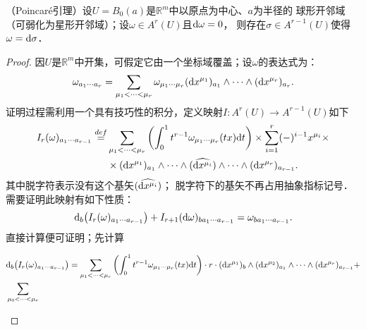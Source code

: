 \begin{theorem}\label{chdf:thm_poincare-lemma}
     （Poincar\'{e}引理）设$U=B_0(a)$是$\mathbb{R}^m$中以原点为中心、$a$为半径的
     球形开邻域（可弱化为星形开邻域）；设$\omega \in A^r(U)$且${\rm d}\omega =0$，
     则存在$\sigma \in A^{r-1}(U)$使得$\omega = {\rm d}\sigma$．
\end{theorem}
\begin{proof}
    因$U$是$\mathbb{R}^m$中开集，可假定它由一个坐标域覆盖；设$\omega$的表达式为：
    \begin{equation}
         \omega_{a_{1}\cdots a_{r}} = \sum_{\mu_{1}<\cdots<\mu_{r}} \omega_{\mu_{1}\cdots \mu_{r}}
          ({\rm d}x^{\mu_1})_{a_{1}} \wedge\cdots\wedge ({\rm d}x^{\mu_r})_{a_{r}} .
    \end{equation}
    证明过程需利用一个具有技巧性的积分，定义映射$I:A^r(U)\to A^{r-1}(U)$如下
    \begin{equation}\label{chdf:eqn_I-omega}
    \begin{aligned}
        I_r(\omega )_{a_{1}\cdots a_{r-1}} \overset{def}{=}& \sum_{\mu_{1}<\cdots<\mu_{r}}
         \left( \int_{0}^{1}t^{r-1} \omega_{\mu_{1}\cdots \mu_{r}}(tx){\rm d}t \right) \times
         \sum_{i=1}^{r}  (-)^{i-1} x^{\mu_i} \times \\
         & \times ({\rm d}x^{\mu_1})_{a_{1}} \wedge\cdots\wedge
         (\widehat{{\rm d}x^{\mu_i}}) \wedge \cdots \wedge ({\rm d}x^{\mu_r})_{a_{r-1}} .
    \end{aligned}
    \end{equation}
    其中脱字符$\widehat{}$表示没有这个基矢$(\widehat{{\rm d}x^{\mu_i}})$；
    脱字符下的基矢不再占用抽象指标记号．
    需要证明此映射有如下性质：
    \begin{equation}\label{chdm:eqn_dIpId}
        {\rm d}_{b}\bigl( I_r (\omega)_{a_{1}\cdots a_{r-1}} \bigr)
        + I_{r+1}({\rm d}\omega )_{ba_{1}\cdots a_{r-1}} = \omega_{ba_{1}\cdots a_{r-1}} .
    \end{equation}
    直接计算便可证明；先计算
\setlength{\mathindent}{0em}
    \begin{small}
    \begin{align*}
        &{\rm d}_{b}\bigl( I_r (\omega)_{a_{1}\cdots a_{r-1}} \bigr) =  \sum_{\mu_{1}<\cdots<\mu_{r}}
        \left( \int_{0}^{1}t^{r-1} \omega_{\mu_{1}\cdots \mu_{r}}(tx){\rm d}t \right)\cdot r\cdot
        ({\rm d}x^{\mu_1})_{b}\wedge ({\rm d}x^{\mu_2})_{a_{1}} \wedge\cdots\wedge ({\rm d}x^{\mu_r})_{a_{r-1}}  + \\
        &\sum_{\mu_{0}<\cdots<\mu_{r}}

\end{align*}
\end{small}
\end{proof}
